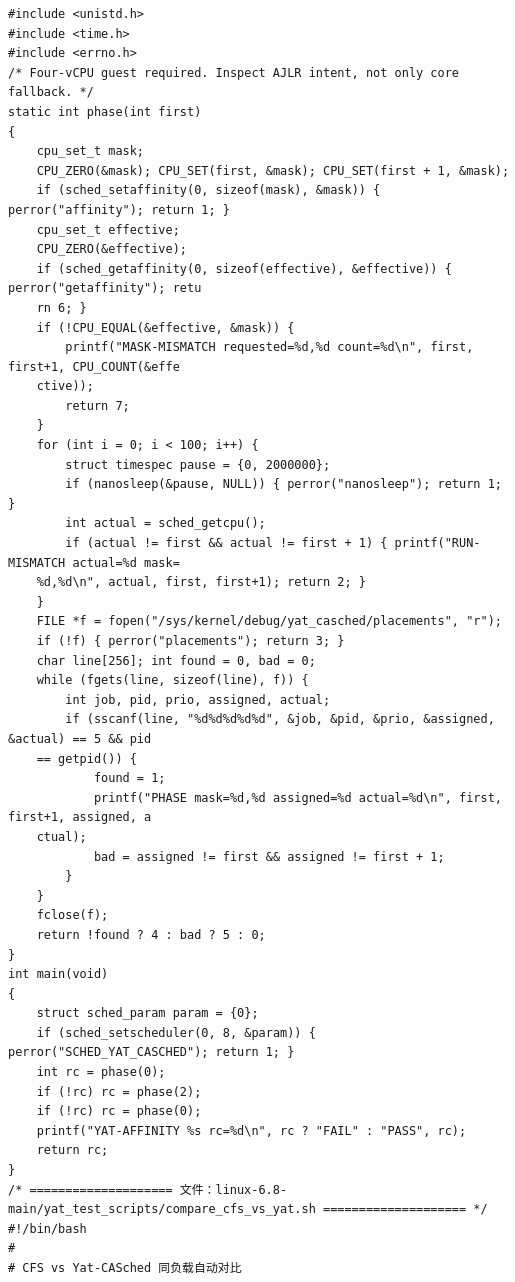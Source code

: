 \documentclass[10pt,a4paper]{article}
\newenvironment{yatpage}{\vspace*{0pt}}{\par}
\begin{document}
\begin{yatpage}
\begin{Verbatim}[fontsize=\fontsize{8.2}{9.8}\selectfont]
#include <unistd.h>
#include <time.h>
#include <errno.h>
/* Four-vCPU guest required. Inspect AJLR intent, not only core fallback. */
static int phase(int first)
{
    cpu_set_t mask;
    CPU_ZERO(&mask); CPU_SET(first, &mask); CPU_SET(first + 1, &mask);
    if (sched_setaffinity(0, sizeof(mask), &mask)) { perror("affinity"); return 1; }
    cpu_set_t effective;
    CPU_ZERO(&effective);
    if (sched_getaffinity(0, sizeof(effective), &effective)) { perror("getaffinity"); retu
    rn 6; }
    if (!CPU_EQUAL(&effective, &mask)) {
        printf("MASK-MISMATCH requested=%d,%d count=%d\n", first, first+1, CPU_COUNT(&effe
    ctive));
        return 7;
    }
    for (int i = 0; i < 100; i++) {
        struct timespec pause = {0, 2000000};
        if (nanosleep(&pause, NULL)) { perror("nanosleep"); return 1; }
        int actual = sched_getcpu();
        if (actual != first && actual != first + 1) { printf("RUN-MISMATCH actual=%d mask=
    %d,%d\n", actual, first, first+1); return 2; }
    }
    FILE *f = fopen("/sys/kernel/debug/yat_casched/placements", "r");
    if (!f) { perror("placements"); return 3; }
    char line[256]; int found = 0, bad = 0;
    while (fgets(line, sizeof(line), f)) {
        int job, pid, prio, assigned, actual;
        if (sscanf(line, "%d%d%d%d%d", &job, &pid, &prio, &assigned, &actual) == 5 && pid 
    == getpid()) {
            found = 1;
            printf("PHASE mask=%d,%d assigned=%d actual=%d\n", first, first+1, assigned, a
    ctual);
            bad = assigned != first && assigned != first + 1;
        }
    }
    fclose(f);
    return !found ? 4 : bad ? 5 : 0;
}
int main(void)
{
    struct sched_param param = {0};
    if (sched_setscheduler(0, 8, &param)) { perror("SCHED_YAT_CASCHED"); return 1; }
    int rc = phase(0);
    if (!rc) rc = phase(2);
    if (!rc) rc = phase(0);
    printf("YAT-AFFINITY %s rc=%d\n", rc ? "FAIL" : "PASS", rc);
    return rc;
}
/* ==================== 文件：linux-6.8-main/yat_test_scripts/compare_cfs_vs_yat.sh ==================== */
#!/bin/bash
#
# CFS vs Yat-CASched 同负载自动对比
\end{Verbatim}
\end{yatpage}
\newpage
\end{document}
